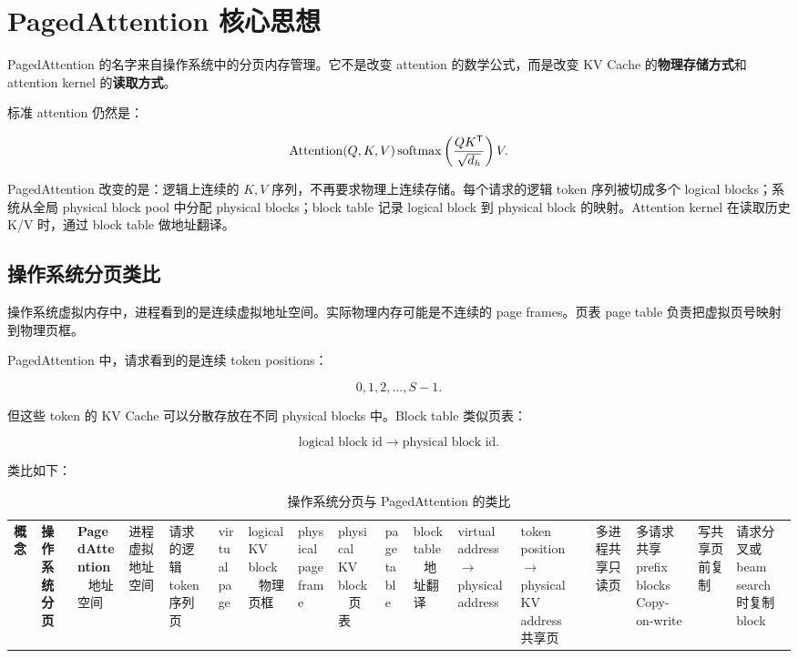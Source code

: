 \section{PagedAttention 核心思想}
\label{sec:paged-attention-core-idea}

PagedAttention 的名字来自操作系统中的分页内存管理。它不是改变 attention 的数学公式，而是改变 KV Cache 的\textbf{物理存储方式}和 attention kernel 的\textbf{读取方式}。

标准 attention 仍然是：

\[
\operatorname{Attention}(Q,K,V)
\operatorname{softmax}
\left(
\frac{QK^{\mathsf{T}}}{\sqrt{d_h}}
\right)V.
\]

PagedAttention 改变的是：逻辑上连续的 $K,V$ 序列，不再要求物理上连续存储。每个请求的逻辑 token 序列被切成多个 logical blocks；系统从全局 physical block pool 中分配 physical blocks；block table 记录 logical block 到 physical block 的映射。Attention kernel 在读取历史 K/V 时，通过 block table 做地址翻译。

\subsection{操作系统分页类比}
\label{subsec:os-paging-analogy}

操作系统虚拟内存中，进程看到的是连续虚拟地址空间。实际物理内存可能是不连续的 page frames。页表 page table 负责把虚拟页号映射到物理页框。

PagedAttention 中，请求看到的是连续 token positions：

\[
0,1,2,\ldots,S-1.
\]

但这些 token 的 KV Cache 可以分散存放在不同 physical blocks 中。Block table 类似页表：

\[
\text{logical block id}
\rightarrow
\text{physical block id}.
\]

类比如下：

\begin{table}[H]
\centering
\small
\caption{操作系统分页与 PagedAttention 的类比}
\label{tab:os-paging-pagedattention-analogy}
\begin{tabular}{p{}p{}p{}}
\hline
\textbf{概念} & \textbf{操作系统分页} & \textbf{PagedAttention} \
\hline
地址空间
& 进程虚拟地址空间
& 请求的逻辑 token 序列 \
\hline
页
& virtual page
& logical KV block \
\hline
物理页框
& physical page frame
& physical KV block \
\hline
页表
& page table
& block table \
\hline
地址翻译
& virtual address $\rightarrow$ physical address
& token position $\rightarrow$ physical KV address \
\hline
共享页
& 多进程共享只读页
& 多请求共享 prefix blocks \
\hline
Copy-on-write
& 写共享页前复制
& 请求分叉或 beam search 时复制 block \
\hline
\end{tabular}
\end{table}

